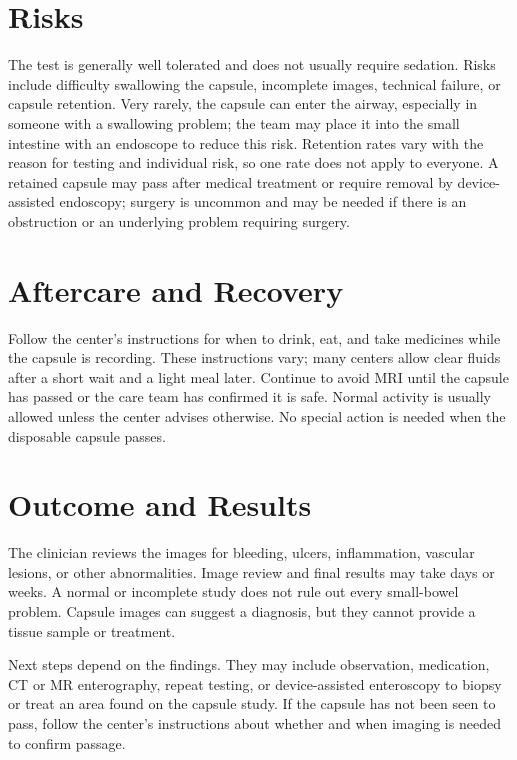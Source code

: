 \section*{Risks}
The test is generally well tolerated and does not usually require sedation. Risks include difficulty swallowing the capsule, incomplete images, technical failure, or capsule retention. Very rarely, the capsule can enter the airway, especially in someone with a swallowing problem; the team may place it into the small intestine with an endoscope to reduce this risk. Retention rates vary with the reason for testing and individual risk, so one rate does not apply to everyone. A retained capsule may pass after medical treatment or require removal by device-assisted endoscopy; surgery is uncommon and may be needed if there is an obstruction or an underlying problem requiring surgery.

\section*{Aftercare and Recovery}
Follow the center's instructions for when to drink, eat, and take medicines while the capsule is recording. These instructions vary; many centers allow clear fluids after a short wait and a light meal later. Continue to avoid MRI until the capsule has passed or the care team has confirmed it is safe. Normal activity is usually allowed unless the center advises otherwise. No special action is needed when the disposable capsule passes.

\section*{Outcome and Results}
The clinician reviews the images for bleeding, ulcers, inflammation, vascular lesions, or other abnormalities. Image review and final results may take days or weeks. A normal or incomplete study does not rule out every small-bowel problem. Capsule images can suggest a diagnosis, but they cannot provide a tissue sample or treatment.

Next steps depend on the findings. They may include observation, medication, CT or MR enterography, repeat testing, or device-assisted enteroscopy to biopsy or treat an area found on the capsule study. If the capsule has not been seen to pass, follow the center's instructions about whether and when imaging is needed to confirm passage.

